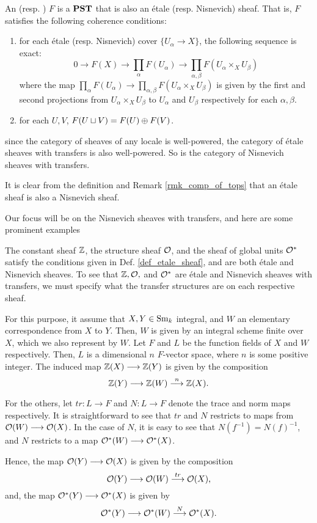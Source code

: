 \begin{defn}\label{def_etale_sheaf}\label{def_nis_sheaf}
An  (resp. ) $F$ is a $\mathbf{PST}$ that is also
an \'etale (resp. Nisnevich) sheaf. That is, $F$ satisfies the
following coherence conditions:
\begin{enumerate}
\item for each \'etale (resp. Nisnevich) cover $\{U_\alpha \to 
X\}$, the following sequence is exact:
\[
0 \to F(X) \to \prod_\alpha F(U_\alpha) \to \prod_{\alpha, \beta} 
   F(U_\alpha \times_X U_\beta)
\]
where the map $\prod_\alpha F(U_\alpha) \to \prod_{\alpha, \beta} 
F(U_\alpha \times_X U_\beta)$ is given by the first and second 
projections from $U_\alpha \times_X U_\beta$ to $U_\alpha$ and
$U_\beta$ respectively for each $\alpha, \beta$.

\item for each $U, V$, $F(U \sqcup V) = F(U) \oplus F(V)$.
\end{enumerate}
\end{defn}

since the category of sheaves of any locale is well-powered, the 
category of \'etale sheaves with transfers is also well-powered. 
So is the category of Nisnevich sheaves with transfers.

\begin{rmk}
It is clear from the definition and Remark \ref{rmk_comp_of_tops}
that an \'etale sheaf is also a Nisnevich sheaf.
\end{rmk}

Our focus will be on the Nisnevich sheaves with transfers, and 
here are some prominent examples 

\begin{ex}\label{ex_Z_O_Ostar}
The constant sheaf $\mathbb{Z}$, the structure sheaf $\mathcal{O}$, and the sheaf
of global units $\mathcal{O}^*$ satisfy the conditions given in Def. 
\ref{def_etale_sheaf}, and are both \'etale and Nisnevich sheaves.
To see that $\mathbb{Z}, \mathcal{O},$ and $\mathcal{O}^*$ are \'etale and Nisnevich sheaves
with transfers, we must specify what the transfer structures are
on each respective sheaf.

For this purpose, it assume that $X, Y \in \mathrm{Sm}_{k}$ integral, and
$W$ an elementary correspondence from $X$ to $Y$. Then, $W$ is
given by an integral scheme finite over $X$, which we also 
represent by $W$. Let $F$ and $L$ be the function fields of $X$ 
and $W$ respectively. Then, $L$ is a dimensional $n$ $F$-vector 
space, where $n$ is some positive integer. The induced map $\mathbb{Z}(X) 
\longrightarrow \mathbb{Z}(Y)$ is given by the composition
\[
\mathbb{Z}(Y) \longrightarrow \mathbb{Z}(W) \stackrel{n}{\longrightarrow} \mathbb{Z}(X).
\]

For the others, let $tr: L \to F$ and $N: L \to F$ denote the 
trace and norm maps respectively. It is straightforward to see 
that $tr$ and $N$ restricts to maps from $\mathcal{O}(W) \longrightarrow \mathcal{O}(X)$. In
the case of $N$, it is easy to see that $N(f^{-1}) = N(f)^{-1}$,
and $N$ restricts to a map $\mathcal{O}^*(W) \longrightarrow \mathcal{O}^*(X)$.

Hence, the map $\mathcal{O}(Y) \longrightarrow \mathcal{O}(X)$ is given by the composition
\[
\mathcal{O}(Y) \longrightarrow \mathcal{O}(W) \stackrel{tr}{\longrightarrow} \mathcal{O}(X),
\]
and, the map $\mathcal{O}^*(Y) \longrightarrow \mathcal{O}^*(X)$ is given by
\[
\mathcal{O}^*(Y) \longrightarrow \mathcal{O}^*(W) \stackrel{N}{\longrightarrow} \mathcal{O}^*(X).
\]
\end{ex}

